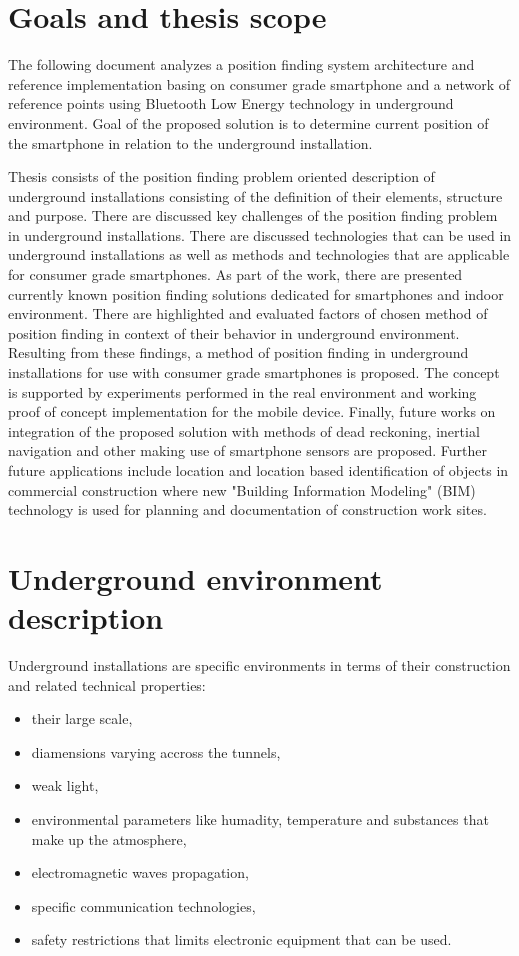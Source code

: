 \documentclass[../main.tex]{subfiles}
\begin{document}
\chapter{Goals and thesis scope}

The following document analyzes a position finding system architecture and reference implementation basing on consumer grade smartphone and a network of reference points using Bluetooth Low Energy technology in underground environment. Goal of the proposed solution is to determine current position of the smartphone in relation to the underground installation.

Thesis consists of the position finding problem oriented description of underground installations consisting of the definition of their elements, structure and purpose. There are discussed key challenges of the position finding problem in underground installations. There are discussed technologies that can be used in underground installations as well as methods and technologies that are applicable for consumer grade smartphones. As part of the work, there are presented currently known position finding solutions dedicated for smartphones and indoor environment. There are highlighted and evaluated factors of chosen method of position finding in context of their behavior in underground environment. Resulting from these findings, a method of position finding in underground installations for use with consumer grade smartphones is proposed. The concept is supported by experiments performed in the real environment and working proof of concept implementation for the mobile device. Finally, future works on integration of the proposed solution with methods of dead reckoning, inertial navigation and other making use of smartphone sensors are proposed. Further future applications include location and location based identification of objects in commercial construction where new "Building Information Modeling" (BIM) technology is used for planning and documentation of construction work sites.

\chapter{Underground environment description}

Underground installations are specific environments in terms of their construction and related technical properties:
\begin{itemize}
	\item their large scale,
	\item diamensions varying accross the tunnels,
	\item weak light,
	\item environmental parameters like humadity, temperature and substances that make up the atmosphere,
	\item electromagnetic waves propagation,
	\item specific communication technologies,
	\item safety restrictions that limits electronic equipment that can be used.
\end{itemize}
\end{document}
